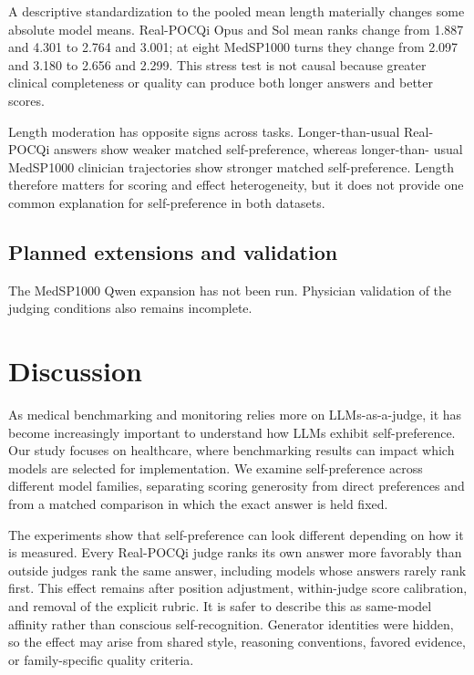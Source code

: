 \documentclass[11pt]{article}
\begin{document}
A descriptive standardization to the pooled mean length materially changes
some absolute model means. Real-POCQi Opus and Sol mean ranks change from 1.887
and 4.301 to 2.764 and 3.001; at eight MedSP1000 turns they change from 2.097
and 3.180 to 2.656 and 2.299. This stress test is not causal because greater
clinical completeness or quality can produce both longer answers and better
scores.

Length moderation has opposite signs across tasks. Longer-than-usual
Real-POCQi answers show weaker matched self-preference, whereas longer-than-
usual MedSP1000 clinician trajectories show stronger matched self-preference.
Length therefore matters for scoring and effect heterogeneity, but it does not
provide one common explanation for self-preference in both datasets.

\subsection{Planned extensions and validation}

The MedSP1000 Qwen expansion has not been run. Physician validation of the
judging conditions also remains incomplete.

\section{Discussion}

As medical benchmarking and monitoring relies more on LLMs-as-a-judge, it has
become increasingly important to understand how LLMs exhibit
self-preference. Our study focuses on healthcare, where benchmarking results
can impact which models are selected for implementation. We examine
self-preference across different model families, separating scoring generosity
from direct preferences and from a matched comparison in which the exact answer
is held fixed.

The experiments show that self-preference can look different depending on how
it is measured. Every Real-POCQi judge
ranks its own answer more favorably than outside judges rank the same answer,
including models whose answers rarely rank first. This effect remains after
position adjustment, within-judge score calibration, and removal of the
explicit rubric. It is safer to describe this as same-model affinity rather
than conscious self-recognition. Generator identities were hidden, so the
effect may arise from shared style, reasoning conventions, favored evidence,
or family-specific quality criteria.
\end{document}
